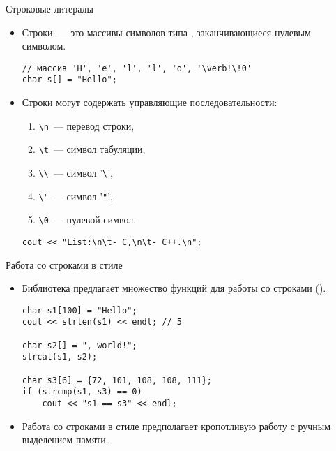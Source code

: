 \documentclass{beamer}
\begin{document}
\begin{frame}[fragile]{Строковые литералы}
    \begin{itemize}
        \item Строки~--- это массивы символов
            типа , заканчивающиеся нулевым символом.
\begin{lstlisting}
// массив 'H', 'e', 'l', 'l', 'o', '\verb!\!0'
char s[] = "Hello";

\end{lstlisting}

        \item Строки могут содержать управляющие последовательности:
            \begin{enumerate}
                \item \verb!\n!~--- перевод строки,
                \item \verb!\t!~--- символ табуляции,
                \item \verb!\\!~--- символ '\verb!\!',
                \item \verb!\"!~--- символ '\verb!"!',
                \item \verb!\0!~--- нулевой символ.
            \end{enumerate}

\begin{lstlisting}
cout << "List:\n\t- C,\n\t- C++.\n";
\end{lstlisting}
    \end{itemize}
\end{frame}

\begin{frame}[fragile]{Работа со строками в стиле \langc}
    \begin{itemize}
        \item Библиотека  предлагает множество
            функций для работы со строками ().
\begin{lstlisting}
char s1[100] = "Hello";
cout << strlen(s1) << endl; // 5

char s2[] = ", world!";
strcat(s1, s2);
                               
char s3[6] = {72, 101, 108, 108, 111};
if (strcmp(s1, s3) == 0)
    cout << "s1 == s3" << endl;
\end{lstlisting}
        \item Работа со строками в стиле \langc предполагает
            кропотливую работу с ручным выделением памяти.
    \end{itemize}
\end{frame}
\end{document}
